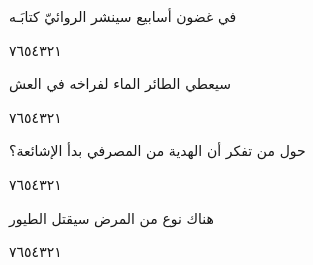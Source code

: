 \documentclass[11pt, a4paper]{article}
\begin{document}
{\vspace{0.5\baselineskip}\begin{flushright}
\textarabic{في غضون أسابيع سينشر الروائيّ كتابَـه}
\end{flushright}

\begin{center}
        \hfill\textarabic{٧}\hfill\textarabic{٦}\hfill\textarabic{٥}\hfill\textarabic{٤}\hfill\textarabic{٣}\hfill\textarabic{٢}\hfill\textarabic{١}
        \end{center}


\vspace{0.5\baselineskip}\begin{flushright}
\textarabic{سيعطي الطائر الماء لفراخه في العش}
\end{flushright}

\begin{center}
        \hfill\textarabic{٧}\hfill\textarabic{٦}\hfill\textarabic{٥}\hfill\textarabic{٤}\hfill\textarabic{٣}\hfill\textarabic{٢}\hfill\textarabic{١}
        \end{center}


\vspace{0.5\baselineskip}\begin{flushright}
\textarabic{حول من تفكر أن الهدية من المصرفي بدأ الإشائعة؟}
\end{flushright}

\begin{center}
        \hfill\textarabic{٧}\hfill\textarabic{٦}\hfill\textarabic{٥}\hfill\textarabic{٤}\hfill\textarabic{٣}\hfill\textarabic{٢}\hfill\textarabic{١}
        \end{center}


\vspace{0.5\baselineskip}\begin{flushright}
\textarabic{هناك نوع من المرض سيقتل الطيور}
\end{flushright}

\begin{center}
        \hfill\textarabic{٧}\hfill\textarabic{٦}\hfill\textarabic{٥}\hfill\textarabic{٤}\hfill\textarabic{٣}\hfill\textarabic{٢}\hfill\textarabic{١}
        \end{center}


\vspace{0.5\baselineskip}}



\vfill
\end{document}
